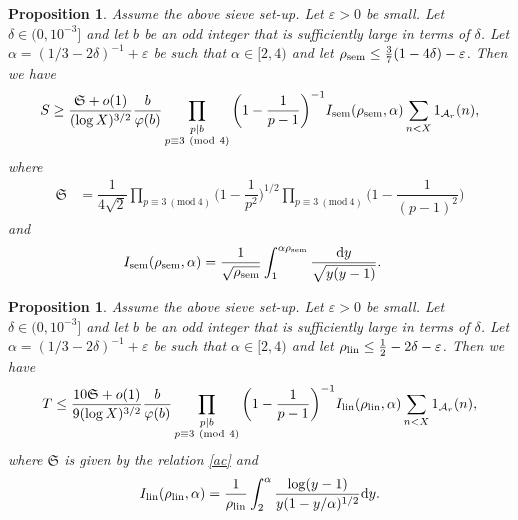 \documentclass[12pt]{amsart}
\numberwithin{equation}{section}
\newtheorem{prop}[theorem]{Proposition}
\theoremstyle{remark}
\theoremstyle{definition}
\newcommand{\imod}[1]{\ (\mathrm{mod}\ #1)}
\begin{document}
\begin{prop}\label{PropAppS} Assume the above sieve set-up. Let $\varepsilon>0$ be small. Let $\delta\in (0, 10^{-3}]$ and let $b$ be an odd integer that is sufficiently large in terms of $\delta$. Let $\alpha=(1/3-2\delta)^{-1}+\varepsilon$ be such that $\alpha\in [2, 4)$ and let $\rho_{\textup{sem}}\leq \frac{3}{7}(1-4\delta)-\varepsilon$. Then we have 
\begin{align}
\label{EqS1} S\geq \dfrac{\mathfrak{S}+ o(1)}{(\log X)^{3/2}}\dfrac{b}{\varphi(b)}\prod_{\substack{p|b\\p\equiv 3\imod 4}}\bigg(1-\dfrac{1}{p-1}\bigg)^{-1}I_{\textup{sem}}(\rho_{\textup{sem}}, \alpha)\sum_{\substack{n<X}}1_{\mathcal{A}_r}(n),
\end{align}
where
\begin{align}
\label{ac} \mathfrak{S} &=\dfrac{1}{4\sqrt{2}}\prod_{p\equiv 3\imod 4}\bigg(1-\dfrac{1}{p^2}\bigg)^{1/2}\prod_{p\equiv 3\imod 4}\bigg(1-\dfrac{1}{(p-1)^2}\bigg)
\end{align}
and
\begin{align}
\label{eq: isem} I_{\textup{sem}}(\rho_{\textup{sem}}, \alpha)&=\dfrac{1}{\sqrt{\rho_{\textup{sem}}}}\int_{1}^{\alpha \rho_{\textup{sem}}} \dfrac{\textup{d}y}{\sqrt{y(y-1)}}.
\end{align}

\end{prop}

\begin{prop}\label{PropAppT} Assume the above sieve set-up. Let $\varepsilon>0$ be small. Let $\delta\in (0, 10^{-3}]$ and let $b$ be an odd integer that is sufficiently large in terms of $\delta$. Let $\alpha=(1/3-2\delta)^{-1} + \varepsilon$ be such that $\alpha\in [2, 4)$ and let $\rho_{\textup{lin}}\leq \frac{1}{2}-2\delta-\varepsilon$. Then we have
\begin{align}
\label{EqT1} T\leq \dfrac{10\mathfrak{S}+o(1)}{9(\log X)^{3/2}} \dfrac{b}{\varphi(b)}\prod_{\substack{p|b\\p\equiv 3\imod 4}}\bigg(1-\dfrac{1}{p-1}\bigg)^{-1}I_{\textup{lin}}(\rho_{\textup{lin}}, \alpha)\sum_{\substack{n<X}}1_{\mathcal{A}_r}(n),
\end{align}
where $\mathfrak{S}$ is given by the relation \eqref{ac} and
\begin{align}
\label{eq: ilin} I_{\textup{lin}}(\rho_{\textup{lin}}, \alpha)=\dfrac{1}{\rho_{\textup{lin}}}\int_{2}^\alpha\dfrac{\log (y-1)}{y(1-y/\alpha)^{1/2}}\textup{d}y.
\end{align}

\end{prop}
\end{document}
